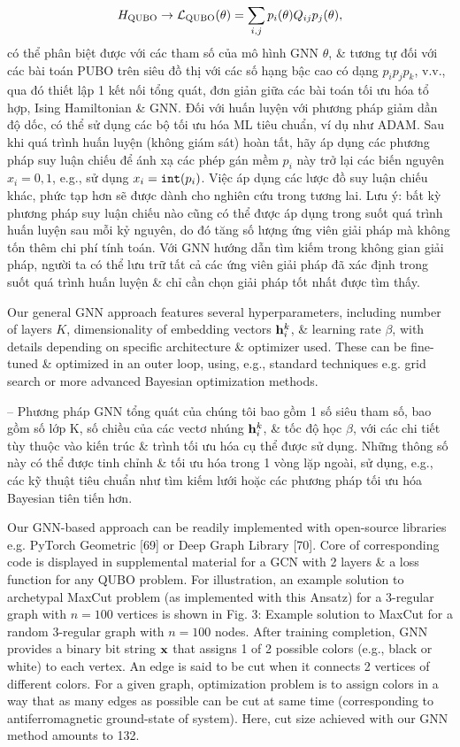 \documentclass{article}
\begin{document}
\begin{itemize}
    \begin{equation*}
        H_{\rm QUBO}\to{\cal L}_{\rm QUBO}(\theta) = \sum_{i,j} p_i(\theta)Q_{ij}p_j(\theta),
    \end{equation*}
    có thể phân biệt được với các tham số của mô hình GNN $\theta$, \& tương tự đối với các bài toán PUBO trên siêu đồ thị với các số hạng bậc cao có dạng $p_ip_jp_k$, v.v., qua đó thiết lập 1 kết nối tổng quát, đơn giản giữa các bài toán tối ưu hóa tổ hợp, Ising Hamiltonian \& GNN. Đối với huấn luyện với phương pháp giảm dần độ dốc, có thể sử dụng các bộ tối ưu hóa ML tiêu chuẩn, ví dụ như ADAM. Sau khi quá trình huấn luyện (không giám sát) hoàn tất, hãy áp dụng các phương pháp suy luận chiếu để ánh xạ các phép gán mềm $p_i$ này trở lại các biến nguyên $x_i = 0,1$, e.g., sử dụng $x_i = {\tt int}(p_i)$. Việc áp dụng các lược đồ suy luận chiếu khác, phức tạp hơn sẽ được dành cho nghiên cứu trong tương lai. Lưu ý: bất kỳ phương pháp suy luận chiếu nào cũng có thể được áp dụng trong suốt quá trình huấn luyện sau mỗi kỷ nguyên, do đó tăng số lượng ứng viên giải pháp mà không tốn thêm chi phí tính toán. Với GNN hướng dẫn tìm kiếm trong không gian giải pháp, người ta có thể lưu trữ tất cả các ứng viên giải pháp đã xác định trong suốt quá trình huấn luyện \& chỉ cần chọn giải pháp tốt nhất được tìm thấy.

    Our general GNN approach features several hyperparameters, including number of layers $K$, dimensionality of embedding vectors ${\bf h}_i^k$, \& learning rate $\beta$, with details depending on specific architecture \& optimizer used. These can be fine-tuned \& optimized in an outer loop, using, e.g., standard techniques e.g. grid search or more advanced Bayesian optimization methods.

    -- Phương pháp GNN tổng quát của chúng tôi bao gồm 1 số siêu tham số, bao gồm số lớp K, số chiều của các vectơ nhúng ${\bf h}_i^k$, \& tốc độ học $\beta$, với các chi tiết tùy thuộc vào kiến trúc \& trình tối ưu hóa cụ thể được sử dụng. Những thông số này có thể được tinh chỉnh \& tối ưu hóa trong 1 vòng lặp ngoài, sử dụng, e.g., các kỹ thuật tiêu chuẩn như tìm kiếm lưới hoặc các phương pháp tối ưu hóa Bayesian tiên tiến hơn.

    Our GNN-based approach can be readily implemented with open-source libraries e.g. PyTorch Geometric [69] or Deep Graph Library [70]. Core of corresponding code is displayed in supplemental material for a GCN with 2 layers \& a loss function for any QUBO problem. For illustration, an example solution to archetypal MaxCut problem (as implemented with this Ansatz) for a 3-regular graph with $n = 100$ vertices is shown in {\sf Fig. 3: Example solution to MaxCut for a random 3-regular graph with $n = 100$ nodes. After training completion, GNN provides a binary bit string ${\bf x}$ that assigns 1 of 2 possible colors (e.g., black or white) to each vertex. An edge is said to be cut when it connects 2 vertices of different colors. For a given graph, optimization problem is to assign colors in a way that as many edges as possible can be cut at same time (corresponding to antiferromagnetic ground-state of system).} Here, cut size achieved with our GNN method amounts to 132.


\end{itemize}
\end{document}
